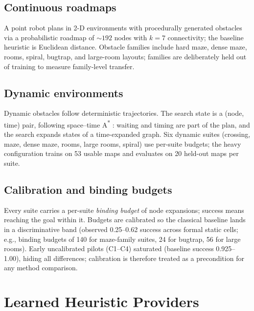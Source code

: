 \documentclass[11pt,letterpaper]{article}
\newcommand{\stage}[1]{\textsc{#1}}
\begin{document}
\subsection{Continuous roadmaps}
A point robot plans in 2-D environments with procedurally generated obstacles via a probabilistic roadmap \citep[PRM;][]{kavraki1996prm} of ${\sim}192$ nodes with $k{=}7$ connectivity; the baseline heuristic is Euclidean distance. Obstacle families include hard maze, dense maze, rooms, spiral, bugtrap, and large-room layouts; families are deliberately held out of training to measure family-level transfer.

\subsection{Dynamic environments}
Dynamic obstacles follow deterministic trajectories. The search state is a (node, time) pair, following space--time A\textsuperscript{*} \citep{silver2005cooperative,phillips2011sipp}: waiting and timing are part of the plan, and the search expands states of a time-expanded graph. Six dynamic suites (crossing, maze, dense maze, rooms, large rooms, spiral) use per-suite budgets; the heavy configuration trains on 53 usable maps and evaluates on 20 held-out maps per suite.

\subsection{Calibration and binding budgets}
Every suite carries a per-suite \emph{binding budget} of node expansions; success means reaching the goal within it. Budgets are calibrated so the classical baseline lands in a discriminative band (observed 0.25--0.62 success across formal static cells; e.g., binding budgets of 140 for maze-family suites, 24 for bugtrap, 56 for large rooms). Early uncalibrated pilots (\stage{C1}--\stage{C4}) saturated (baseline success 0.925--1.00), hiding all differences; calibration is therefore treated as a precondition for any method comparison.

\section{Learned Heuristic Providers}
\end{document}
